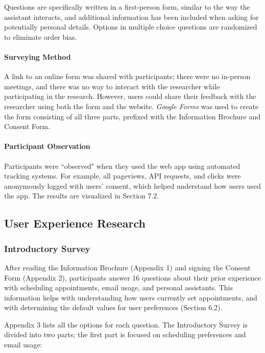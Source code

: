 \documentclass{article}
\begin{document}
Questions are specifically written in a first-person form, similar to the way the assistant interacts, and additional information has been included when asking for potentially personal details. Options in multiple choice questions are randomized to eliminate order bias.

\paragraph{Surveying Method}

A link to an online form was shared with participants; there were no in-person meetings, and there was no way to interact with the researcher while participating in the research. However, users could share their feedback with the researcher using both the form and the website. \emph{Google Forms} was used to create the form consisting of all three parts, prefixed with the Information Brochure and Consent Form.

\paragraph{Participant Observation}

Participants were ``observed" when they used the web app using automated tracking systems. For example, all pageviews, API requests, and clicks were anonymously logged with users' consent, which helped understand how users used the app. The results are visualized in Section 7.2.

\subsection{User Experience Research}

\subsubsection{Introductory Survey}

After reading the Information Brochure (Appendix 1) and signing the Consent Form (Appendix 2), participants answer 16 questions about their prior experience with scheduling appointments, email usage, and personal assistants. This information helps with understanding how users currently set appointments, and with determining the default values for user preferences (Section 6.2).

Appendix 3 lists all the options for each question. The Introductory Survey is divided into two parts; the first part is focused on scheduling preferences and email usage:
\end{document}
